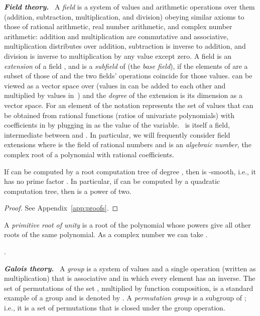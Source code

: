 \documentclass[oribibl,10pt]{llncs}
\newcommand{\Emph}[1]{\smallskip\textbf{\textit{#1}}~}
\begin{document}
\Emph{Field theory.}
A \emph{field} is a system of values and arithmetic operations over them (addition, subtraction, multiplication, and division) obeying similar axioms to those of rational arithmetic, real number arithmetic, and complex number arithmetic: addition and multiplication are commutative and associative, multiplication distributes over addition, subtraction is inverse to addition, and division is inverse to multiplication by any value except zero. A field  is an \emph{extension} of a field , and  is a \emph{subfield} of  (the \emph{base field}), if the elements of  are a subset of those of  and the two fields' operations coincide for those values.  can be viewed as a vector space over  (values in  can be added to each other and multiplied by values in~) and the \emph{degree}  of the extension is its dimension as a vector space.
For an element  of  the notation  represents the set of values that can be obtained from rational functions (ratios of univariate polynomials) with coefficients in  by plugging in  as the value of the variable. ~is itself a field, intermediate between  and . In particular, we will frequently consider field extensions  where  is the field of rational numbers and  is an \emph{algebraic number}, the complex root of a polynomial with rational coefficients.

\begin{lemma}\label{lem:extensions}
If  can be computed by a root computation tree of degree , then  is -smooth, i.e., it has no prime factor  . In particular, if  can be computed by a quadratic computation tree, then  is a power of two.
\end{lemma}

\begin{proof}
See Appendix~\ref{app:proofs}.
\end{proof}

A \emph{primitive root of unity}  is a root of
\ifFull
the polynomial
\fi
 whose powers give all  other roots of the same polynomial. As a complex number we can take
.

\begin{lemma}
\label{lem:roots-of-unity}
.
\end{lemma}

\Emph{Galois theory.}
A \emph{group} is a system of values and a single operation (written as multiplication) that is associative and in which every element has an inverse. The set of permutations of the set , multiplied by function composition, is a standard example of a group and is denoted by . A \emph{permutation group} is a subgroup of ; i.e., it is a set of permutations that is closed under the group operation.
\end{document}
